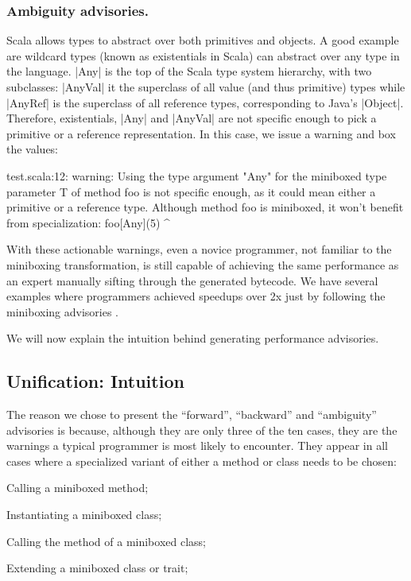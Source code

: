 \subsubsection{Ambiguity advisories.} Scala allows types to abstract over both primitives and objects. A good example are wildcard types (known as existentials in Scala) can abstract over any type in the language. |Any| is the top of the Scala type system hierarchy, with two subclasses: |AnyVal| it the superclass of all value (and thus primitive) types while |AnyRef| is the superclass of all reference types, corresponding to Java's |Object|. Therefore, existentials, |Any| and |AnyVal| are not specific enough to pick a primitive or a reference representation. In this case, we issue a warning and box the values:

\begin{lstlisting-nobreak-nolang}
test.scala:12: warning: Using the type argument "Any" for the miniboxed type parameter T of method foo is not specific enough, as it could mean either a primitive or a reference type. Although method foo is miniboxed, it won't benefit from specialization:
              foo[Any](5)
                   ^
\end{lstlisting-nobreak-nolang}

With these actionable warnings, even a novice programmer, not familiar to the miniboxing transformation, is still capable of achieving the same performance as an expert manually sifting through the generated bytecode. We have several examples where programmers achieved speedups over 2x just by following the miniboxing advisories \cite{miniboxing-www,tixxit-respecialization6,pnwscala-pureimage}.

We will now explain the intuition behind generating performance advisories.

\subsection{Unification: Intuition}

The reason we chose to present the ``forward'', ``backward'' and ``ambiguity'' advisories is because, although they are only three of the ten cases, they are the warnings a typical programmer is most likely to encounter. They appear in all cases where a specialized variant of either a method or class needs to be chosen:

\begin{compactitem}
 \item Calling a miniboxed method;
 \item Instantiating a miniboxed class;
 \item Calling the method of a miniboxed class;
 \item Extending a miniboxed class or trait;
\end{compactitem}


